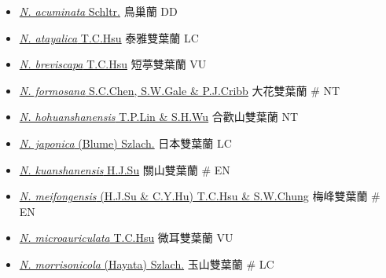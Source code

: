 \begin{itemize}
  \begin{itemize}
        \item[] \href{http://www.theplantlist.org/tpl1.1/search?q=Neottia+acuminata}{\textit{N. acuminata} Schltr.}   鳥巢蘭   DD
        \item[] \href{http://www.theplantlist.org/tpl1.1/search?q=Neottia+atayalica}{\textit{N. atayalica} T.C.Hsu}   泰雅雙葉蘭   LC
        \item[] \href{http://www.theplantlist.org/tpl1.1/search?q=Neottia+breviscapa}{\textit{N. breviscapa} T.C.Hsu}   短葶雙葉蘭   VU
        \item[] \href{http://www.theplantlist.org/tpl1.1/search?q=Neottia+formosana}{\textit{N. formosana} S.C.Chen, S.W.Gale \& P.J.Cribb}   大花雙葉蘭  \# NT
        \item[] \href{http://www.theplantlist.org/tpl1.1/search?q=Neottia+hohuanshanensis}{\textit{N. hohuanshanensis} T.P.Lin \& S.H.Wu}   合歡山雙葉蘭   NT
        \item[] \href{http://www.theplantlist.org/tpl1.1/search?q=Neottia+japonica}{\textit{N. japonica} (Blume) Szlach.}   日本雙葉蘭   LC
        \item[] \href{http://www.theplantlist.org/tpl1.1/search?q=Neottia+kuanshanensis}{\textit{N. kuanshanensis} H.J.Su}   關山雙葉蘭  \# EN
        \item[] \href{http://www.theplantlist.org/tpl1.1/search?q=Neottia+meifongensis}{\textit{N. meifongensis} (H.J.Su \& C.Y.Hu) T.C.Hsu \& S.W.Chung}   梅峰雙葉蘭  \# EN
        \item[] \href{http://www.theplantlist.org/tpl1.1/search?q=Neottia+microauriculata}{\textit{N. microauriculata} T.C.Hsu}   微耳雙葉蘭   VU
        \item[] \href{http://www.theplantlist.org/tpl1.1/search?q=Neottia+morrisonicola}{\textit{N. morrisonicola} (Hayata) Szlach.}   玉山雙葉蘭  \# LC

\end{itemize}
\end{itemize}

